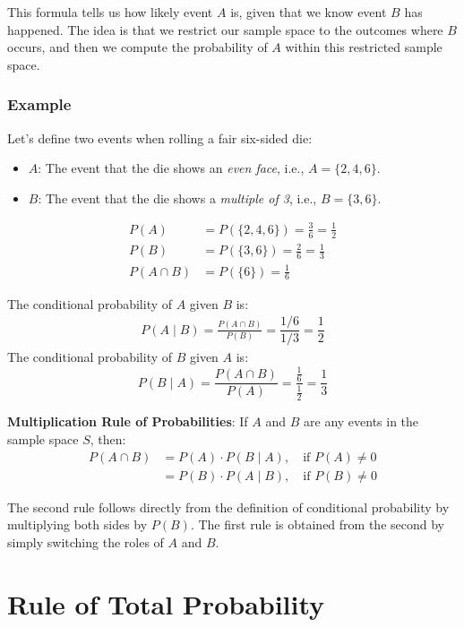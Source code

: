 \documentclass[twoside]{book}
\begin{document}
This formula tells us how likely event \( A \) is, given that we know event \( B \) has happened. The idea is that we restrict our sample space to the outcomes where \( B \) occurs, and then we compute the probability of \( A \) within this restricted sample space.

\subsubsection{Example}

Let's define two events when rolling a fair six-sided die:

\begin{itemize}
    \item \( A \): The event that the die shows an \textit{even face}, i.e., \( A = \{2, 4, 6\} \).
    \item \( B \): The event that the die shows a \textit{multiple of 3}, i.e., \( B = \{3, 6\} \).
\end{itemize}
\begin{align*}
    P(A) &= P(\{2, 4, 6\})= \frac{3}{6} = \frac{1}{2} \\
    P(B) &= P(\{3, 6\})=  \frac{2}{6} = \frac{1}{3} \\
    P(A \cap B) &= P(\{6\}) = \frac{1}{6}
\end{align*}

The conditional probability of \( A \) given \( B \) is:
\begin{align*}
P(A \mid B) = \frac{P(A \cap B)}{P(B)} = \dfrac{1/6}{1/3}  = \dfrac{1}{2}
\end{align*}
The conditional probability of \( B \) given \( A \) is:
\[
P(B \mid A) = \frac{P(A \cap B)}{P(A)} =\frac{\frac{1}{6}}{\frac{1}{2}} = \frac{1}{3}
\]
\begin{textbox}
\textbf{Multiplication Rule of Probabilities}: If \( A \) and \( B \) are any events in the sample space \( S \), then:
\begin{align*}
    P(A \cap B) &= P(A) \cdot P(B \mid A), \quad \text{if } P(A) \neq 0 \\
 &= P(B) \cdot P(A \mid B), \quad \text{if } P(B) \neq 0
\end{align*}
\end{textbox}
The second rule follows directly from the definition of conditional probability by multiplying both sides by \( P(B) \).
The first rule is obtained from the second by simply switching the roles of \( A \) and \( B \).

\section{Rule of Total Probability}
\end{document}
